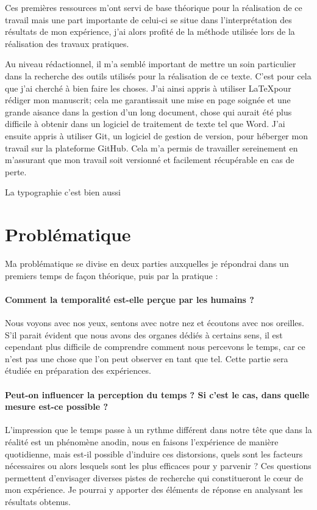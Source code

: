 \documentclass[12pt,fleqn,oneside,french,openany]{book} %
\begin{document}
Ces premières ressources m'ont servi de base théorique pour la réalisation de ce travail mais une part importante de celui-ci se situe dans l'interprétation des résultats de mon expérience, j'ai alors profité de la méthode utilisée lors de la réalisation des travaux pratiques. 

Au niveau rédactionnel, il m'a semblé important de mettre un soin particulier dans la recherche des outils utilisés pour la réalisation de ce texte. C'est pour cela que j'ai cherché à bien faire les choses. J'ai ainsi appris à utiliser \LaTeX pour rédiger mon manuscrit; cela me garantissait une mise en page soignée et une grande aisance dans la gestion d'un long document, chose qui aurait été plus difficile à obtenir dans un logiciel de traitement de texte tel que Word. J'ai ensuite appris à utiliser Git, un logiciel de gestion de version, pour héberger mon travail sur la plateforme GitHub. Cela m'a permis de travailler sereinement en m'assurant que mon travail soit versionné et facilement récupérable en cas de perte.

La typographie c'est bien aussi \cite{typo}

\section{Problématique} \label{sec:problematique}
Ma problématique se divise en deux parties auxquelles je répondrai dans un premiers temps de façon théorique, puis par la pratique :

\paragraph{Comment la temporalité est-elle perçue par les humains ?} Nous voyons avec nos yeux, sentons avec notre nez et écoutons avec nos oreilles. S'il parait évident que nous avons des organes dédiés à certains sens, il est cependant plus difficile de comprendre comment nous percevons le temps, car ce n'est pas une chose que l'on peut observer en tant que tel. Cette partie sera étudiée en préparation des expériences. 

\paragraph{Peut-on influencer la perception du temps ? Si c'est le cas, dans quelle mesure est-ce possible ?} L'impression que le temps passe à un rythme différent dans notre tête que dans la réalité est un phénomène anodin, nous en faisons l'expérience de manière quotidienne, mais est-il possible d'induire ces distorsions, quels sont les facteurs nécessaires ou alors lesquels sont les plus efficaces pour y parvenir ? Ces questions permettent d'envisager diverses pistes de recherche qui constitueront le cœur de mon expérience. Je pourrai y apporter des éléments de réponse en analysant les résultats obtenus. %
\end{document}
